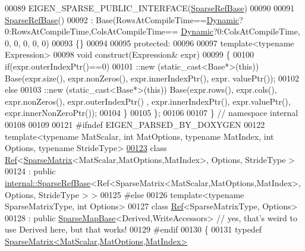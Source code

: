 \begin{DoxyCode}
00089   EIGEN\_SPARSE\_PUBLIC\_INTERFACE(\hyperlink{class_eigen_1_1internal_1_1_sparse_ref_base}{SparseRefBase})
00090 
00091   \hyperlink{class_eigen_1_1internal_1_1_sparse_ref_base}{SparseRefBase}()
00092     : Base(RowsAtCompileTime==\hyperlink{namespace_eigen_ad81fa7195215a0ce30017dfac309f0b2}{Dynamic}?0:RowsAtCompileTime,ColsAtCompileTime==
      \hyperlink{namespace_eigen_ad81fa7195215a0ce30017dfac309f0b2}{Dynamic}?0:ColsAtCompileTime, 0, 0, 0, 0, 0)
00093   \{\}
00094   
00095 \textcolor{keyword}{protected}:
00096 
00097   \textcolor{keyword}{template}<\textcolor{keyword}{typename} Expression>
00098   \textcolor{keywordtype}{void} construct(Expression& expr)
00099   \{
00100     \textcolor{keywordflow}{if}(expr.outerIndexPtr()==0)
00101       ::\textcolor{keyword}{new} (static\_cast<Base*>(\textcolor{keyword}{this})) Base(expr.size(), expr.nonZeros(), expr.innerIndexPtr(), expr.
      valuePtr());
00102     else
00103       ::new (static\_cast<Base*>(\textcolor{keyword}{this})) Base(expr.rows(), expr.cols(), expr.nonZeros(), expr.outerIndexPtr()
      , expr.innerIndexPtr(), expr.valuePtr(), expr.innerNonZeroPtr());
00104   \}
00105 \};
00106 
00107 \} \textcolor{comment}{// namespace internal}
00108 
00109 
00121 \textcolor{preprocessor}{#ifndef EIGEN\_PARSED\_BY\_DOXYGEN}
00122 \textcolor{keyword}{template}<\textcolor{keyword}{typename} MatScalar, \textcolor{keywordtype}{int} MatOptions, \textcolor{keyword}{typename} MatIndex, \textcolor{keywordtype}{int} Options, \textcolor{keyword}{typename} Str\textcolor{keywordtype}{id}eType>
\hyperlink{group___sparse_core___module}{00123} \textcolor{keyword}{class }\hyperlink{group___core___module_class_eigen_1_1_ref}{Ref}<\hyperlink{group___sparse_core___module_class_eigen_1_1_sparse_matrix}{SparseMatrix}<MatScalar,MatOptions,MatIndex>, Options, StrideType >
00124   : \textcolor{keyword}{public} \hyperlink{class_eigen_1_1internal_1_1_sparse_ref_base}{internal::SparseRefBase}<Ref<SparseMatrix<MatScalar,MatOptions,MatIndex>, 
      Options, StrideType > >
00125 \textcolor{preprocessor}{#else}
00126 template<typename SparseMatrixType, int Options>
00127 class \hyperlink{group___core___module_class_eigen_1_1_ref}{Ref}<SparseMatrixType, Options>
00128   : \textcolor{keyword}{public} \hyperlink{class_eigen_1_1_sparse_map_base}{SparseMapBase}<Derived,WriteAccessors> \textcolor{comment}{// yes, that's weird to use Derived here, but
       that works!}
00129 \textcolor{preprocessor}{#endif}
00130 \{
00131     \textcolor{keyword}{typedef} \hyperlink{group___sparse_core___module_class_eigen_1_1_sparse_matrix}{SparseMatrix<MatScalar,MatOptions,MatIndex>} 

\end{DoxyCode}
